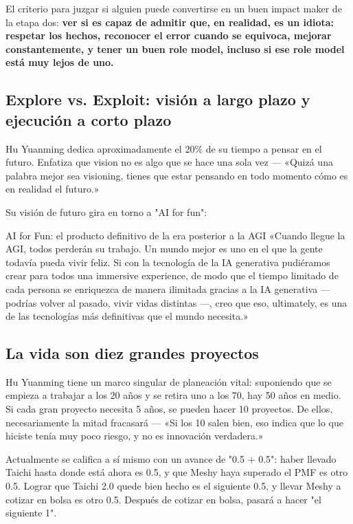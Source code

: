 \documentclass[a4paper]{article}
\begin{document}
El criterio para juzgar si alguien puede convertirse en un buen impact maker de la etapa dos: \textbf{ver si es capaz de admitir que, en realidad, es un idiota: respetar los hechos, reconocer el error cuando se equivoca, mejorar constantemente, y tener un buen role model, incluso si ese role model está muy lejos de uno.}

\subsection{Explore vs. Exploit: visión a largo plazo y ejecución a corto plazo}

Hu Yuanming dedica aproximadamente el 20\% de su tiempo a pensar en el futuro. Enfatiza que vision no es algo que se hace una sola vez — «Quizá una palabra mejor sea visioning, tienes que estar pensando en todo momento cómo es en realidad el futuro.»

Su visión de futuro gira en torno a "AI for fun":

\begin{knowledgebox}{AI for Fun: el producto definitivo de la era posterior a la AGI}
«Cuando llegue la AGI, todos perderán su trabajo. Un mundo mejor es uno en el que la gente todavía pueda vivir feliz. Si con la tecnología de la IA generativa pudiéramos crear para todos una immersive experience, de modo que el tiempo limitado de cada persona se enriquezca de manera ilimitada gracias a la IA generativa — podrías volver al pasado, vivir vidas distintas —, creo que eso, ultimately, es una de las tecnologías más definitivas que el mundo necesita.»
\end{knowledgebox}

\subsection{La vida son diez grandes proyectos}

Hu Yuanming tiene un marco singular de planeación vital: suponiendo que se empieza a trabajar a los 20 años y se retira uno a los 70, hay 50 años en medio. Si cada gran proyecto necesita 5 años, se pueden hacer 10 proyectos. De ellos, necesariamente la mitad fracasará — «Si los 10 salen bien, eso indica que lo que hiciste tenía muy poco riesgo, y no es innovación verdadera.»

Actualmente se califica a sí mismo con un avance de "0.5 + 0.5": haber llevado Taichi hasta donde está ahora es 0.5, y que Meshy haya superado el PMF es otro 0.5. Lograr que Taichi 2.0 quede bien hecho es el siguiente 0.5, y llevar Meshy a cotizar en bolsa es otro 0.5. Después de cotizar en bolsa, pasará a hacer "el siguiente 1".
\end{document}

